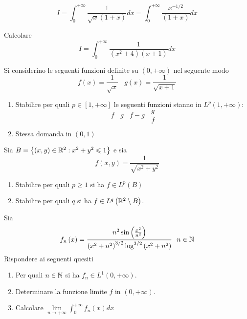 \begin{equation*}
I=\int ^{+\infty }_{0}\frac{1}{\sqrt{x}\left( 1+x\right)} dx=\int ^{+\infty }_{0}\frac{x^{-1/2}}{\left( 1+x\right)} dx
\end{equation*}
\Esercizio{}

Calcolare
\begin{equation*}
I=\int ^{+\infty }_{0}\frac{1}{\left( x^{2} +4\right)\left( x+1\right)} dx
\end{equation*}

Si considerino le seguenti funzioni definite su $\left( 0,+\infty \right)$ nel seguente modo
\begin{equation*}
f\left( x\right) =\frac{1}{\sqrt{x}} \ \ \ \ g\left( x\right) =\frac{1}{\sqrt{x+1}}
\end{equation*}
\begin{enumerate}
\item Stabilire per quali $p\in \left[ 1,+\infty \right]$ le seguenti funzioni stanno in $L^{p}\left( 1,+\infty \right)$:\begin{equation*}
f\ \ \ \ g\ \ \ \ f-g\ \ \ \ \frac{g}{f}
\end{equation*}
\item Stessa domanda in $\left( 0,1\right)$
\end{enumerate}
\Esercizio{ }

Sia $B=\left\{\left( x,y\right) \in \mathbb{R} ^{2} :x^{2} +y^{2} \leqslant 1\right\}$ e sia
\begin{equation*}
f\left( x,y\right) =\frac{1}{\sqrt{x^{2} +y^{2}}}
\end{equation*}
\begin{enumerate}
\item Stabilire per quali $p\geqslant 1$ si ha $f\in L^{p}\left( B\right)$
\item Stabilire per quali $q$ si ha $f\in L^{q}\left(\mathbb{R} ^{2} \setminus B\right)$.
\end{enumerate}
\Esercizio{}

Sia
\begin{equation*}
f_{n}\left( x\right) =\frac{n^{2}\sin\left(\frac{x^{2}}{n^{2}}\right)}{\left( x^{2} +n^{2}\right)^{3/2}\log^{3/2}\left( x^{2} +n^{2}\right)} \ \ n\in \mathbb{N} 
\end{equation*}
Rispondere ai seguenti quesiti
\begin{enumerate}
\item Per quali $n\in \mathbb{N} $ si ha $f_{n} \in L^{1}\left( 0,+\infty \right)$.
\item Determinare la funzione limite $f$ in $\left( 0,+\infty \right)$.
\item Calcolare $\lim\limits _{n\rightarrow +\infty }\int ^{+\infty }_{0} f_{n}\left( x\right) dx$
\end{enumerate}
\Esercizio{}

